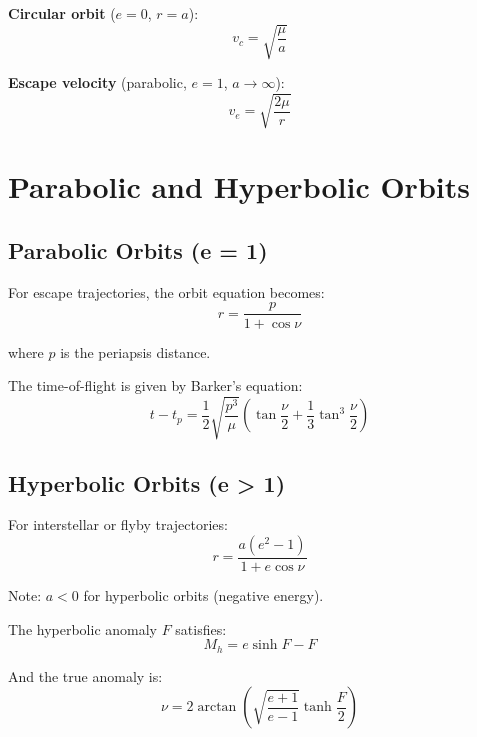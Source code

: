 \textbf{Circular orbit} ($e = 0$, $r = a$):
\begin{equation}
    v_c = \sqrt{\frac{\mu}{a}}
\end{equation}

\textbf{Escape velocity} (parabolic, $e = 1$, $a \to \infty$):
\begin{equation}
    v_e = \sqrt{\frac{2\mu}{r}}
\end{equation}

\section{Parabolic and Hyperbolic Orbits}

\subsection{Parabolic Orbits (e = 1)}

For escape trajectories, the orbit equation becomes:
\begin{equation}
    r = \frac{p}{1 + \cos\nu}
\end{equation}

where $p$ is the periapsis distance.

The time-of-flight is given by Barker's equation:
\begin{equation}
    t - t_p = \frac{1}{2}\sqrt{\frac{p^3}{\mu}}\left(\tan\frac{\nu}{2} + \frac{1}{3}\tan^3\frac{\nu}{2}\right)
\end{equation}

\subsection{Hyperbolic Orbits (e > 1)}

For interstellar or flyby trajectories:
\begin{equation}
    r = \frac{a(e^2-1)}{1 + e\cos\nu}
\end{equation}

Note: $a < 0$ for hyperbolic orbits (negative energy).

The hyperbolic anomaly $F$ satisfies:
\begin{equation}
    M_h = e\sinh F - F
\end{equation}

And the true anomaly is:
\begin{equation}
    \nu = 2\arctan\left(\sqrt{\frac{e+1}{e-1}}\tanh\frac{F}{2}\right)
\end{equation}

